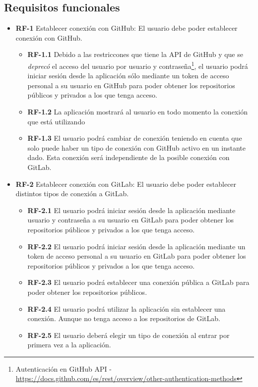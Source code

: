 \subsection{Requisitos funcionales}

\begin{itemize}
\item \textbf{RF-1} Establecer conexión con GitHub: El usuario debe poder establecer conexión con GitHub.
	\begin{itemize}
		\item \textbf{RF-1.1} Debido a las restriccones que tiene la API de GitHub y que se \textit{deprecó} el acceso del usuario por usuario y contraseña\footnote{Autenticación en GitHub API - \url{https://docs.github.com/es/rest/overview/other-authentication-methods}}, el usuario podrá iniciar sesión desde la aplicación sólo mediante un token de acceso personal a su usuario en GitHub para poder obtener los repositorios públicos y privados a los que tenga acceso.
		\item \textbf{RF-1.2} La aplicación mostrará al usuario en todo momento la conexión que está utilizando
		\item \textbf{RF-1.3} El usuario podrá cambiar de conexión teniendo en cuenta que solo puede haber un tipo de conexión con GitHub activo en un instante dado. Esta conexión será independiente de la posible conexión con GitLab.
	\end{itemize}
	\item \textbf{RF-2} Establecer conexión con GitLab: El usuario debe poder establecer distintos tipos de conexión a GitLab.
	\begin{itemize}
		\item \textbf{RF-2.1} El usuario podrá iniciar sesión desde la aplicación mediante usuario y contraseña a su usuario en GitLab para poder obtener los repositorios públicos y privados a los que tenga acceso.
		\item \textbf{RF-2.2} El usuario podrá iniciar sesión desde la aplicación mediante un token de acceso personal a su usuario en GitLab para poder obtener los repositorios públicos y privados a los que tenga acceso.
		\item \textbf{RF-2.3} El usuario podrá establecer una conexión pública a GitLab para poder obtener los repositorios públicos.
		\item \textbf{RF-2.4} El usuario podrá utilizar la aplicación sin establecer una conexión. Aunque no tenga acceso a los repositorios de GitLab.
		\item \textbf{RF-2.5} El usuario deberá elegir un tipo de conexión al entrar por primera vez a la aplicación.

\end{itemize}
\end{itemize}
